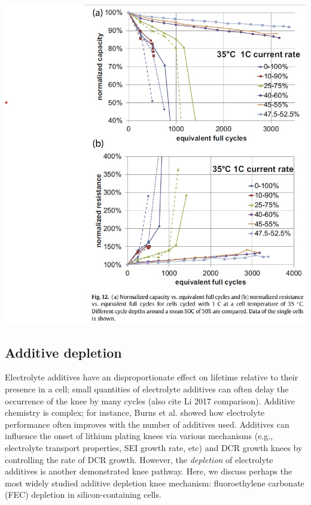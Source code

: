 \documentclass{article}
\begin{document}
\hfil\includegraphics[scale=0.5]{images/Ecker_2014_fig12.jpg}

\subsection{Additive depletion}

Electrolyte additives have an disproportionate effect on lifetime relative to their presence in a cell; small quantities of electrolyte additives can often delay the occurrence of the knee by many cycles\cite{ma_editors_2019} (also cite Li 2017 comparison). Additive chemistry is complex; for instance, Burns et al.\cite{burns_predicting_2013} showed how electrolyte performance often improves with the number of additives used. Additives can influence the onset of lithium plating knees via various mechanisms (e.g., electrolyte transport properties, SEI growth rate, etc) and DCR growth knees by controlling the rate of DCR growth\cite{ma_editors_2019}. However, the \emph{depletion} of electrolyte additives is another demonstrated knee pathway. Here, we discuss perhaps the most widely studied additive depletion knee mechanism: fluoroethylene carbonate (FEC) depletion in silicon-containing cells.
\end{document}
